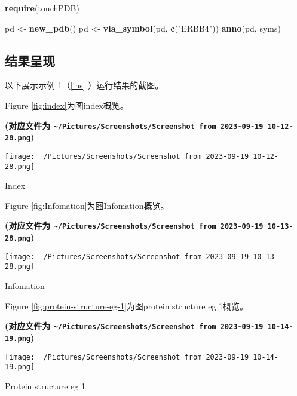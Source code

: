 \documentclass[
]{article}
\newenvironment{Shaded}{\begin{snugshade}}{\end{snugshade}}
\newcommand{\KeywordTok}[1]{\textcolor[rgb]{0.13,0.29,0.53}{\textbf{#1}}}
\newcommand{\NormalTok}[1]{#1}
\newcommand{\StringTok}[1]{\textcolor[rgb]{0.31,0.60,0.02}{#1}}
\begin{document}
\begin{Shaded}
\begin{Highlighting}[]
\KeywordTok{require}\NormalTok{(touchPDB)}

\NormalTok{pd \textless{}{-}}\StringTok{ }\KeywordTok{new\_pdb}\NormalTok{()}
\NormalTok{pd \textless{}{-}}\StringTok{ }\KeywordTok{via\_symbol}\NormalTok{(pd, }\KeywordTok{c}\NormalTok{(}\StringTok{"ERBB4"}\NormalTok{))}
\KeywordTok{anno}\NormalTok{(pd, syms)}
\end{Highlighting}
\end{Shaded}

\hypertarget{ux7ed3ux679cux5448ux73b0}{%
\subsection{结果呈现}\label{ux7ed3ux679cux5448ux73b0}}

以下展示示例 1（\ref{ins} ）运行结果的截图。

Figure \ref{fig:index}为图index概览。

\textbf{(对应文件为 \texttt{\textasciitilde{}/Pictures/Screenshots/Screenshot\ from\ 2023-09-19\ 10-12-28.png})}

\def\@captype{figure}
\begin{center}
\texttt{[image: ~/Pictures/Screenshots/Screenshot from 2023-09-19 10-12-28.png]}
\caption{Index}\label{fig:index}
\end{center}

Figure \ref{fig:Infomation}为图Infomation概览。

\textbf{(对应文件为 \texttt{\textasciitilde{}/Pictures/Screenshots/Screenshot\ from\ 2023-09-19\ 10-13-28.png})}

\def\@captype{figure}
\begin{center}
\texttt{[image: ~/Pictures/Screenshots/Screenshot from 2023-09-19 10-13-28.png]}
\caption{Infomation}\label{fig:Infomation}
\end{center}

Figure \ref{fig:protein-structure-eg-1}为图protein structure eg 1概览。

\textbf{(对应文件为 \texttt{\textasciitilde{}/Pictures/Screenshots/Screenshot\ from\ 2023-09-19\ 10-14-19.png})}

\def\@captype{figure}
\begin{center}
\texttt{[image: ~/Pictures/Screenshots/Screenshot from 2023-09-19 10-14-19.png]}
\caption{Protein structure eg 1}\label{fig:protein-structure-eg-1}
\end{center}
\end{document}
